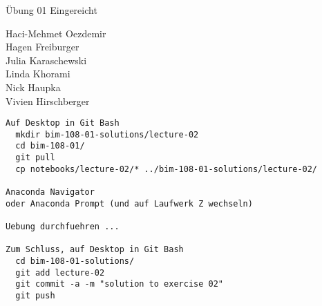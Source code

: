 \documentclass{beamer}
\begin{document}
\begin{frame}{Übung 01 Eingereicht}
	
	\fboxsep=0pt
	\noindent%
	\begin{minipage}[t]{0.48\linewidth}
		Haci-Mehmet Oezdemir \\
		Hagen Freiburger \\
		Julia Karaschewski \\
		Linda Khorami \\
		Nick Haupka \\
		Vivien Hirschberger
	\end{minipage}%
	
\end{frame}

\begin{frame}[fragile]
  
  \small
  \begin{lstlisting}
Auf Desktop in Git Bash
  mkdir bim-108-01-solutions/lecture-02
  cd bim-108-01/
  git pull
  cp notebooks/lecture-02/* ../bim-108-01-solutions/lecture-02/

Anaconda Navigator 
oder Anaconda Prompt (und auf Laufwerk Z wechseln)

Uebung durchfuehren ...

Zum Schluss, auf Desktop in Git Bash
  cd bim-108-01-solutions/
  git add lecture-02
  git commit -a -m "solution to exercise 02"
  git push
  \end{lstlisting}
  
\end{frame}
\end{document}
